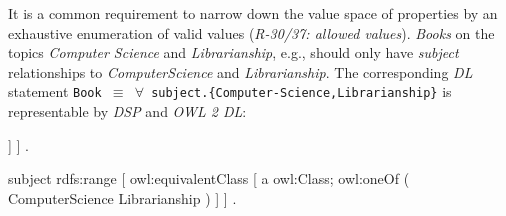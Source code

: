 \documentclass{acm_proc_article-sp}
\newcommand{\ms}[1]{%
  \texttt{#1}
}
\newenvironment{DL}{
  \vspace{0cm}
  \begin{tabular}{l l}

}{
  \end{tabular}
}
\begin{document}
%
%
It is a common requirement to narrow down the value space of properties by an exhaustive enumeration of valid values (\emph{R-30/37: allowed values}). 
\emph{Books} on the topics \emph{Computer Science} and \emph{Librarianship}, e.g., should only have \emph{subject} relationships to \emph{ComputerScience} and \emph{Librarianship}.
The corresponding \emph{DL} statement {\small\ms{Book $\equiv$ $\forall$ subject.\{Computer-Science,Librarianship\}}}
is representable by \emph{DSP} and \emph{OWL 2 DL}:
\begin{ex}
[ a dsp:DescriptionTemplate ;
  dsp:resourceClass Book ; 
  dsp:statementTemplate [ 
    dsp:minOccur 0 ; dsp:maxOccur "infinity" ; 
    dsp:property subject ; 
    dsp:nonLiteralConstraint [ 
      dsp:valueURI ComputerScience, Librarianship ] ] ] .

subject rdfs:range [ owl:equivalentClass [ a owl:Class;
    owl:oneOf ( ComputerScience Librarianship ) ] ] .
\end{ex}
\end{document}
